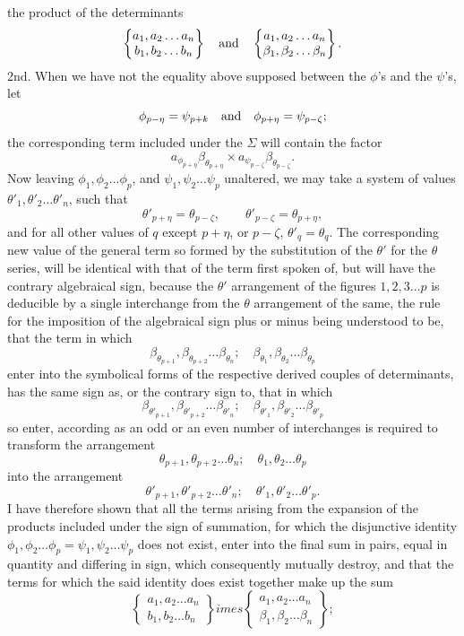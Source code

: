 \documentclass[11pt]{article}
\newcommand{\sourcepage}[1]{\marginpar{\scriptsize p.~#1}}
\newcommand{\bd}[2]{\left\{\begin{matrix}#1\\#2\end{matrix}\right\}}
\begin{document}
{{\sourcepage{254}
the product of the determinants
\[
\bd{a_1,a_2\ldots a_n}{b_1,b_2\ldots b_n}
\quad\hbox{and}\quad
\bd{a_1,a_2\ldots a_n}{\beta_1,\beta_2\ldots\beta_n}.
\]
2nd. When we have not the equality above supposed between the $\phi$'s and the $\psi$'s, let
\[
\phi_{p-\eta}=\psi_{p+k}
\quad\hbox{and}\quad
\phi_{p+\eta}=\psi_{p-\zeta};
\]
the corresponding term included under the $\Sigma$ will contain the factor
\[
 a_{\phi_{p+\eta}}\beta_{\theta_{p+\eta}}\times a_{\psi_{p-\zeta}}\beta_{\theta_{p-\zeta}}.
\]
Now leaving $\phi_1,\phi_2\ldots\phi_p$, and $\psi_1,\psi_2\ldots\psi_p$ unaltered, we may take a system of values $\theta'_1,\theta'_2\ldots\theta'_n$, such that
\[
\theta'_{p+\eta}=\theta_{p-\zeta},
\qquad
\theta'_{p-\zeta}=\theta_{p+\eta},
\]
and for all other values of $q$ except $p+\eta$, or $p-\zeta$, $\theta'_q=\theta_q$. The corresponding new value of the general term so formed by the substitution of the $\theta'$ for the $\theta$ series, will be identical with that of the term first spoken of, but will have the contrary algebraical sign, because the $\theta'$ arrangement of the figures $1,2,3\ldots p$ is deducible by a single interchange from the $\theta$ arrangement of the same, the rule for the imposition of the algebraical sign plus or minus being understood to be, that the term in which
\[
\beta_{\theta_{p+1}},\beta_{\theta_{p+2}}\ldots\beta_{\theta_n};\quad \beta_{\theta_1},\beta_{\theta_2}\ldots\beta_{\theta_p}
\]
enter into the symbolical forms of the respective derived couples of determinants, has the same sign as, or the contrary sign to, that in which
\[
\beta_{\theta'_{p+1}},\beta_{\theta'_{p+2}}\ldots\beta_{\theta'_n};\quad \beta_{\theta'_1},\beta_{\theta'_2}\ldots\beta_{\theta'_p}
\]
so enter, according as an odd or an even number of interchanges is required to transform the arrangement
\[
\theta_{p+1},\theta_{p+2}\ldots\theta_n;\quad\theta_1,\theta_2\ldots\theta_p
\]
into the arrangement
\[
\theta'_{p+1},\theta'_{p+2}\ldots\theta'_n;\quad\theta'_1,\theta'_2\ldots\theta'_p.
\]
I have therefore shown that all the terms arising from the expansion of the products included under the sign of summation, for which the disjunctive identity $\phi_1,\phi_2\ldots\phi_p=\psi_1,\psi_2\ldots\psi_p$ does not exist, enter into the final sum in pairs, equal in quantity and differing in sign, which consequently mutually destroy, and that the terms for which the said identity does exist together make up the sum
\[
\bd{a_1,a_2\ldots a_n}{b_1,b_2\ldots b_n}	imes
\bd{a_1,a_2\ldots a_n}{\beta_1,\beta_2\ldots\beta_n};
\]

}}
\end{document}
